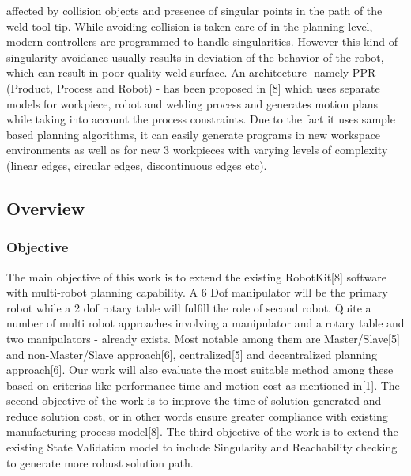 affected by collision objects and presence of singular points in the path of the weld tool tip. While
avoiding collision is taken care of in the planning level, modern controllers are programmed to
handle singularities. However this kind of singularity avoidance usually results in deviation of the
behavior of the robot, which can result in poor quality weld surface.
An architecture- namely PPR (Product, Process and Robot) - has been proposed in [8] which uses
separate models for workpiece, robot and welding process and generates motion plans while
taking into account the process constraints. Due to the fact it uses sample based planning
algorithms, it can easily generate programs in new workspace environments as well as for new
3
workpieces with varying levels of complexity (linear edges, circular edges, discontinuous edges
etc).
\subsection{Overview}
\subsubsection{Objective}
The main objective of this work is to extend the existing RobotKit[8] software with multi-robot
planning capability. A 6 Dof manipulator will be the primary robot while a 2 dof rotary table will fulfill the role of second robot. Quite a number of multi robot approaches involving a
manipulator and a rotary table and two manipulators - already exists. Most notable among them
are Master/Slave[5] and non-Master/Slave approach[6], centralized[5] and decentralized
planning approach[6]. Our work will also evaluate the most suitable method among these based
on criterias like performance time and motion cost as mentioned in[1].
The second objective of the work is to improve the time of solution generated and reduce
solution cost, or in other words ensure greater compliance with existing manufacturing process
model[8].
The third objective of the work is to extend the existing State Validation model to include
Singularity and Reachability checking to generate more robust solution path.
